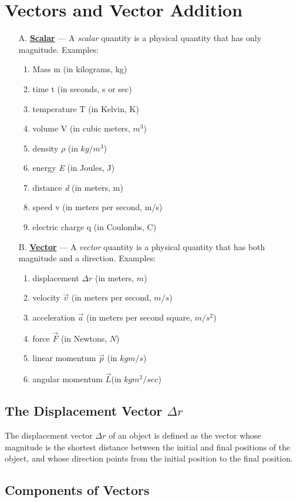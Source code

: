 \documentclass[12pt]{article}
\begin{document}
\section{Vectors and Vector Addition}
\begin{itemize}
    \item[A.] \textbf{\underline{Scalar}} — A \textit{scalar} quantity is a physical quantity that has only magnitude. Examples:
          \begin{enumerate}
              \item Mass m (in kilograms, kg)
              \item time t (in seconds, s or sec)
              \item temperature T (in Kelvin, K)
              \item volume V (in cubic meters, $m^3$)
              \item density $\rho$ (in $kg/m^3$)
              \item energy \textit{E} (in Joules, J)
              \item distance \textit{d} (in meters, m)
              \item speed v (in meters per second, m/s)
              \item electric charge q (in Coulombs, C)
          \end{enumerate}

    \item[B.] \textbf{\underline{Vector}} — A \textit{vector} quantity is a physical quantity that has both magnitude and a direction. Examples:
          \begin{enumerate}
              \item displacement $\Delta r$ (in meters, $m$)
              \item velocity $\vec{v}$ (in meters per second, $m/s$)
              \item acceleration $\vec{a}$ (in meters per second square, $m/s^2$)
              \item force $\vec{F}$ (in Newtons, $N$)
              \item linear momentum $\vec{p}$ (in $kg m/s$)
              \item angular momentum $\vec{L}$(in $kg m^2 / sec$)
          \end{enumerate}
\end{itemize}

\paragraph{}

\subsection{The Displacement Vector $\Delta r$}
The displacement vector $\Delta r$ of an object is defined as the
vector whose magnitude is the shortest distance between
the initial and final positions of the object, and whose
direction points from the initial position to the final
position.

\subsection{Components of Vectors}
\end{document}
